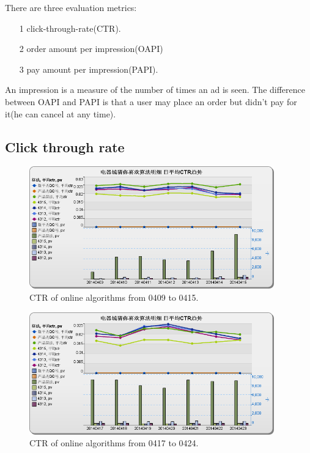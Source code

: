 There are three evaluation metrics: 
\begin{itemize}
\item [1] click-through-rate(CTR). 
\item [2] order amount per impression(OAPI)
\item [3] pay amount per impression(PAPI).
\end{itemize}

An impression is a measure of the number of times an ad is seen. The difference between OAPI and PAPI is that a user may place an order but didn't pay for it(he can cancel at any time).

\subsection{Click through rate}


\begin{figure}
\begin{center}
\includegraphics[width=400px]{fig/yixunexp/ctr0415.png}
\caption{\label{fig:ctr0415} CTR of online algorithms from 0409 to 0415.}

\end{center}
\end{figure}

\begin{figure}
\begin{center}

\includegraphics[width=400px]{fig/yixunexp/ctr0424.png}
\caption{\label{fig:ctr0424} CTR of online algorithms from 0417 to 0424.}
\end{center}
\end{figure}

